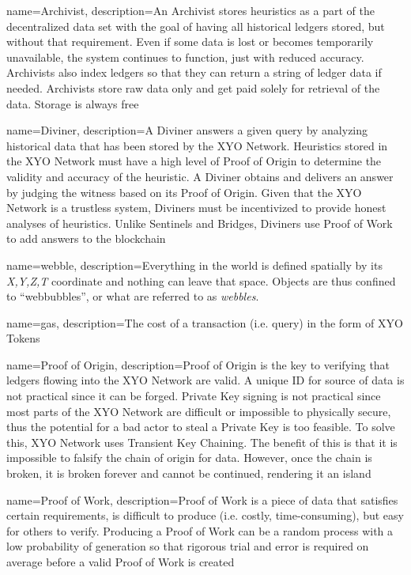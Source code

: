\documentclass{article}
\begin{document}
{
    name={Archivist},
    description={An Archivist stores heuristics as a part of the decentralized data set with the goal of having all historical ledgers stored, but without that requirement. Even if some data is lost or becomes temporarily unavailable, the system continues to function, just with reduced accuracy. Archivists also index ledgers so that they can return a string of ledger data if needed. Archivists store raw data only and get paid solely for retrieval of the data. Storage is always free}
}

{
    name={Diviner},
    description={A Diviner answers a given query by analyzing historical data that has been stored by the XYO Network. Heuristics stored in the XYO Network must have a high level of Proof of Origin to determine the validity and accuracy of the heuristic. A Diviner obtains and delivers an answer by judging the witness based on its Proof of Origin. Given that the XYO Network is a trustless system, Diviners must be incentivized to provide honest analyses of heuristics. Unlike Sentinels and Bridges, Diviners use Proof of Work to add answers to the blockchain}
}

{
    name={webble},
    description={Everything in the world is defined spatially by its \textit{X,Y,Z,T} coordinate and nothing can leave that space. Objects are thus confined to ``webbubbles'', or what are referred to as \textit{webbles}.}
}

{
    name={gas},
    description={The cost of a transaction (i.e. query) in the form of XYO Tokens}
}

{
    name={Proof of Origin},
    description={Proof of Origin is the key to verifying that ledgers flowing into the XYO Network are valid. A unique ID for source of data is not practical since it can be forged. Private Key signing is not practical since most parts of the XYO Network are difficult or impossible to physically secure, thus the potential for a bad actor to steal a Private Key is too feasible. To solve this, XYO Network uses Transient Key Chaining. The benefit of this is that it is impossible to falsify the chain of origin for data. However, once the chain is broken, it is broken forever and cannot be continued, rendering it an island}
}

{
    name={Proof of Work},
    description={Proof of Work is a piece of data that satisfies certain requirements, is difficult to produce (i.e. costly, time-consuming), but easy for others to verify. Producing a Proof of Work can be a random process with a low probability of generation so that rigorous trial and error is required on average before a valid Proof of Work is created}
}
\end{document}
